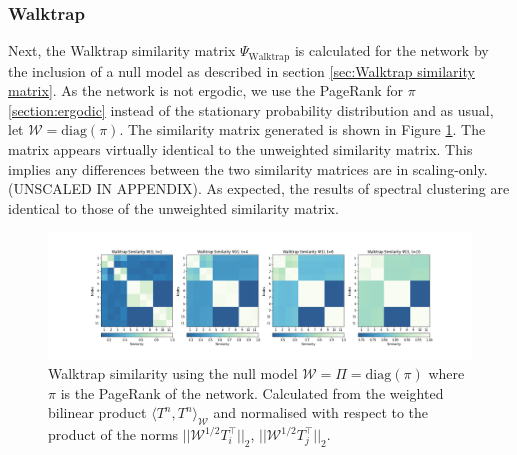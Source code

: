 \documentclass[12pt,a4paper]{article}
\begin{document}
\subsubsection{Walktrap}
Next, the Walktrap similarity matrix $\Psi_{\text{Walktrap}}$ is calculated for the network by the inclusion of a null model as described in section \ref{sec:Walktrap similarity matrix}. As the network is not ergodic, we use the PageRank for $\pi$ \ref{section:ergodic} instead of the stationary probability distribution and as usual, let $\mathcal W = \text{diag}(\pi)$. The similarity matrix generated is shown in Figure \ref{fig:Walktrap toy sim}. The matrix appears virtually identical to the unweighted similarity matrix. This implies any differences between the two similarity matrices are in scaling-only. (UNSCALED IN APPENDIX). As expected, the results of spectral clustering are identical to those of the unweighted similarity matrix.
\begin{figure}[H]
    \centering
    \includegraphics[width=\textwidth]{toy_net/Walktrap_Similarity_toy_net.png}
    \caption{Walktrap similarity using the null model $\mathcal W = \Pi = \text{diag}(\pi)$ where $\pi$ is the PageRank of the network. Calculated from the weighted bilinear product $\langle T^n,T^n \rangle_{\mathcal W}$ and normalised with respect to the product of the norms $||\mathcal{W}^{1/2}T_i^\top||_2$, $|| \mathcal{W}^{1/2}T_j^\top||_2$.}
    \label{fig:Walktrap toy sim}
\end{figure}
\end{document}
